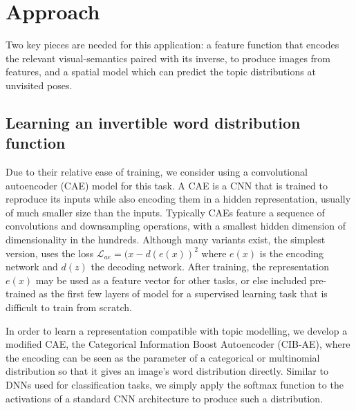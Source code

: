 \section{Approach}
Two key pieces are needed for this application: a feature function that encodes the relevant visual-semantics paired with its inverse, to produce images from features, and a spatial model which can predict the topic distributions at unvisited poses.

\subsection{Learning an invertible word distribution function} \label{sec:learning-features}

Due to their relative ease of training, we consider using a convolutional autoencoder (CAE) model for this task. A CAE is a CNN that is trained to reproduce its inputs while also encoding them in a hidden representation, usually of much smaller size than the inputs. Typically CAEs feature a sequence of convolutions and downsampling operations, with a smallest hidden dimension of dimensionality in the hundreds. Although many variants exist, the simplest version, uses the loss $\mathcal{L}_{ae} = (x - d(e(x))^2$ where $e(x)$ is the encoding network and $d(z)$ the decoding network. After training, the representation $e(x)$ may be used as a feature vector for other tasks, or else included pre-trained as the first few layers of model for a supervised learning task that is difficult to train from scratch.

In order to learn a representation compatible with topic modelling, we develop a modified CAE, the Categorical Information Boost Autoencoder (CIB-AE), where the encoding can be seen as the parameter of a categorical or multinomial distribution so that it gives an image's word distribution directly. Similar to DNNs used for classification tasks, we simply apply the softmax function to the activations of a standard CNN architecture to produce such a distribution.

